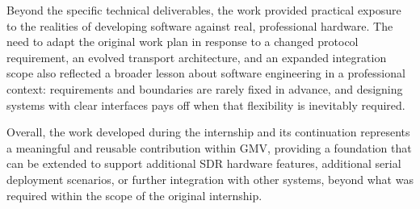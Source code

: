 Beyond the specific technical deliverables, the work provided practical
exposure to the realities of developing software against real, professional
hardware. The need to adapt the original work plan in response to a changed
protocol requirement, an evolved transport architecture, and an expanded
integration scope also reflected a broader lesson about software engineering in
a professional context: requirements and boundaries are rarely fixed in
advance, and designing systems with clear interfaces pays off when that
flexibility is inevitably required.

Overall, the work developed during the internship and its continuation
represents a meaningful and reusable contribution within \gls{GMV}, providing a
foundation
that can be extended to support additional \gls{SDR} hardware features,
additional serial deployment scenarios, or further integration with other
systems, beyond what was required within the scope of the original internship.
